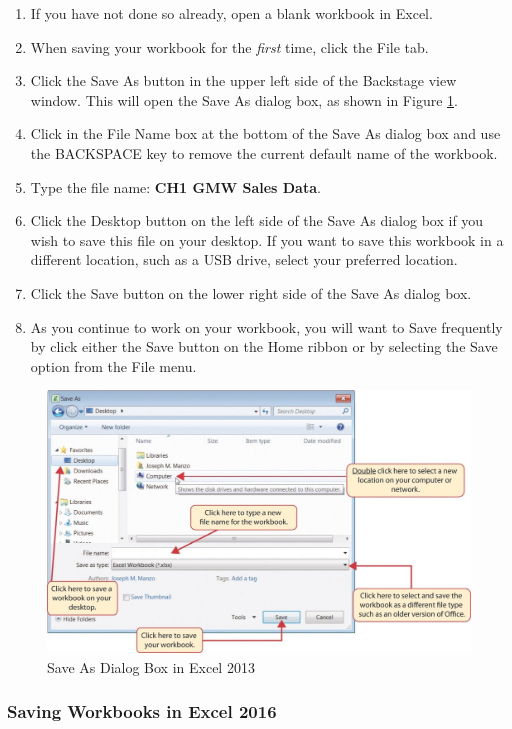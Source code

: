 \begin{enumerate}
	\item If you have not done so already, open a blank workbook in Excel.
	\item When saving your workbook for the \textit{first} time, click the File tab.
	\item Click the Save As button in the upper left side of the Backstage view window. This will open the Save As dialog box, as shown in Figure \ref{01:fig11}.
	\item Click in the File Name box at the bottom of the Save As dialog box and use the BACKSPACE key to remove the current default name of the workbook.
	\item Type the file name: \textbf{CH1 GMW Sales Data}.
	\item Click the Desktop button on the left side of the Save As dialog box if you wish to save this file on your desktop. If you want to save this workbook in a different location, such as a USB drive, select your preferred location.
	\item Click the Save button on the lower right side of the Save As dialog box.
	\item As you continue to work on your workbook, you will want to Save frequently by click either the Save button on the Home ribbon or by selecting the Save option from the File menu.
\end{enumerate}

\begin{figure}[H]
	\centering
	\includegraphics[width=\maxwidth{.95\linewidth}]{gfx/ch01_fig11}
	\caption{Save As Dialog Box in Excel 2013}
	\label{01:fig11}
\end{figure}

\subsubsection{Saving Workbooks in Excel 2016}

